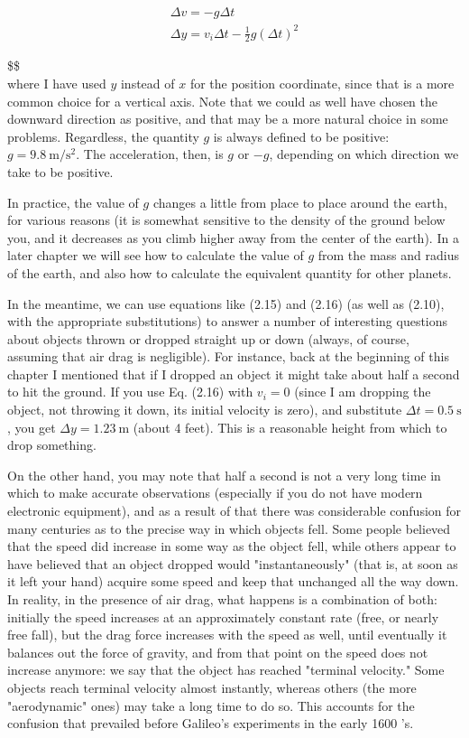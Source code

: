 \documentclass[10pt]{article}
\begin{document}
\begin{gather*}
\Delta v=-g \Delta t  \tag{2.15}\\
\Delta y=v_{i} \Delta t-\frac{1}{2} g(\Delta t)^{2} \tag{2.16}
\end{gather*}

\$\$\\
where I have used $y$ instead of $x$ for the position coordinate, since that is a more common choice for a vertical axis. Note that we could as well have chosen the downward direction as positive, and that may be a more natural choice in some problems. Regardless, the quantity $g$ is always defined to be positive: $g=9.8 \mathrm{~m} / \mathrm{s}^{2}$. The acceleration, then, is $g$ or $-g$, depending on which direction we take to be positive.

In practice, the value of $g$ changes a little from place to place around the earth, for various reasons (it is somewhat sensitive to the density of the ground below you, and it decreases as you climb higher away from the center of the earth). In a later chapter we will see how to calculate the value of $g$ from the mass and radius of the earth, and also how to calculate the equivalent quantity for other planets.

In the meantime, we can use equations like (2.15) and (2.16) (as well as (2.10), with the appropriate substitutions) to answer a number of interesting questions about objects thrown or dropped straight up or down (always, of course, assuming that air drag is negligible). For instance, back at the beginning of this chapter I mentioned that if I dropped an object it might take about half a second to hit the ground. If you use Eq. (2.16) with $v_{i}=0$ (since I am dropping the object, not throwing it down, its initial velocity is zero), and substitute $\Delta t=0.5 \mathrm{~s}$, you get $\Delta y=1.23 \mathrm{~m}$ (about 4 feet). This is a reasonable height from which to drop something.

On the other hand, you may note that half a second is not a very long time in which to make accurate observations (especially if you do not have modern electronic equipment), and as a result of that there was considerable confusion for many centuries as to the precise way in which objects fell. Some people believed that the speed did increase in some way as the object fell, while others appear to have believed that an object dropped would "instantaneously" (that is, at soon as it left your hand) acquire some speed and keep that unchanged all the way down. In reality, in the presence of air drag, what happens is a combination of both: initially the speed increases at an approximately constant rate (free, or nearly free fall), but the drag force increases with the speed as well, until eventually it balances out the force of gravity, and from that point on the speed does not increase anymore: we say that the object has reached "terminal velocity." Some objects reach terminal velocity almost instantly, whereas others (the more "aerodynamic" ones) may take a long time to do so. This accounts for the confusion that prevailed before Galileo's experiments in the early 1600 's.
\end{document}
